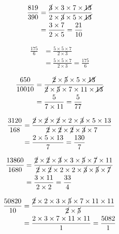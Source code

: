 {{\item\begin{align*}
    \frac{819}{390} &=
    \frac{\cancel{3} \times 3 \times 7 \times \cancel{13}}
    {2 \times \cancel{3} \times 5 \times \cancel{13}}\\ &=
    \frac{3 \times 7}
    {2 \times 5} =
    \frac{21}{10}
    \end{align*}

\item\begin{align*}
    \frac{175}{6} &=
    \frac{5 \times 5 \times 7}
    {2 \times 3}\\ &=
    \frac{5 \times 5 \times 7}
    {2 \times 3} =
    \frac{175}{6}
    \end{align*}

\item\begin{align*}
    \frac{650}{10010} &=
    \frac{\cancel{2} \times \cancel{5} \times 5 \times \cancel{13}}
    {\cancel{2} \times \cancel{5} \times 7 \times 11 \times \cancel{13}}\\ &=
    \frac{5}
    {7 \times 11} =
    \frac{5}{77}
    \end{align*}

\item\begin{align*}
    \frac{3120}{168} &=
    \frac{\cancel{2} \times \cancel{2} \times \cancel{2} \times 2 \times \cancel{3} \times 5 \times 13}
    {\cancel{2} \times \cancel{2} \times \cancel{2} \times \cancel{3} \times 7}\\ &=
    \frac{2 \times 5 \times 13}
    {7} =
    \frac{130}{7}
    \end{align*}

\item\begin{align*}
    \frac{13860}{1680} &=
    \frac{\cancel{2} \times \cancel{2} \times \cancel{3} \times 3 \times \cancel{5} \times \cancel{7} \times 11}
    {\cancel{2} \times \cancel{2} \times 2 \times 2 \times \cancel{3} \times \cancel{5} \times \cancel{7}}\\ &=
    \frac{3 \times 11}
    {2 \times 2} =
    \frac{33}{4}
    \end{align*}

\item\begin{align*}
    \frac{50820}{10} &=
    \frac{\cancel{2} \times 2 \times 3 \times \cancel{5} \times 7 \times 11 \times 11}
    {\cancel{2} \times \cancel{5}}\\ &=
    \frac{2 \times 3 \times 7 \times 11 \times 11}
    {1} =
    \frac{5082}{1}
    \end{align*}

}}
